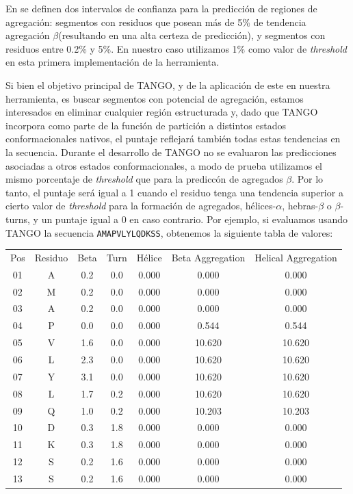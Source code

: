 En \cite{fernandez2004prediction} se definen dos intervalos de confianza para la predicción de regiones de agregación: segmentos con residuos que posean más de 5\% de tendencia agregación $\beta$(resultando en una alta certeza de predicción),
y segmentos con residuos entre 0.2\% y 5\%. En nuestro caso utilizamos 1\% como valor de \textit{threshold} en esta primera implementación de la herramienta.

Si bien el objetivo principal de TANGO, y de la aplicación de este en nuestra herramienta, es buscar segmentos con potencial de agregación, estamos interesados en eliminar cualquier región estructurada y, dado que TANGO incorpora como parte
de la función de partición a distintos estados conformacionales nativos, el puntaje reflejará también todas estas tendencias en la secuencia. Durante el desarrollo de TANGO no se evaluaron las predicciones asociadas a 
otros estados conformacionales, a modo de prueba utilizamos el mismo porcentaje de \textit{threshold} que para la prediccón de agregados $\beta$. 
Por lo tanto, el puntaje será igual a 1 cuando el residuo tenga una tendencia superior a cierto valor de \textit{threshold} para la formación de agregados, hélices-$\alpha$, hebras-$\beta$ o $\beta$-turns, 
y un puntaje igual a 0 en caso contrario.
Por ejemplo, si evaluamos usando TANGO la secuencia \texttt{AMAPVLYLQDKSS}, obtenemos la siguiente tabla de valores:

\vspace{0.3cm}
\begin{tabular}{ccccccc}
Pos & Residuo & Beta & Turn & 	Hélice & Beta Aggregation & Helical Aggregation\\
01 &          A & 0.2 & 0.0 &  0.000  & 0.000 &  0.000\\
02 &          M  &     0.2 &    0.0 &  0.000 &  0.000 &  0.000\\
03 &          A &      0.2  &      0.0 &  0.000 &  0.000  & 0.000\\
04  &         P &      0.0   &     0.0 &  0.000 &  0.544  & 0.544\\
05  &         V &      1.6   &     0.0 &  0.000 &  10.620 & 10.620\\
06   &        L &      2.3   &     0.0 &  0.000 &  10.620 & 10.620\\
07      &     Y &      3.1   &     0.0 &  0.000 &  10.620 & 10.620\\
08        &   L &      1.7   &     0.2 &  0.000 &  10.620 & 10.620\\
09         &  Q &      1.0   &     0.2 &  0.000 &  10.203 & 10.203\\
10   &        D &      0.3    &    1.8 &  0.000 &  0.000 &  0.000\\
11  &         K &      0.3   &     1.8 &  0.000 &  0.000 &  0.000\\
12  &         S &      0.2   &     1.6 &  0.000 &  0.000 &  0.000\\
13  &         S  &     0.2  &      1.6 &  0.000 &  0.000 &  0.000\\
\end{tabular}

